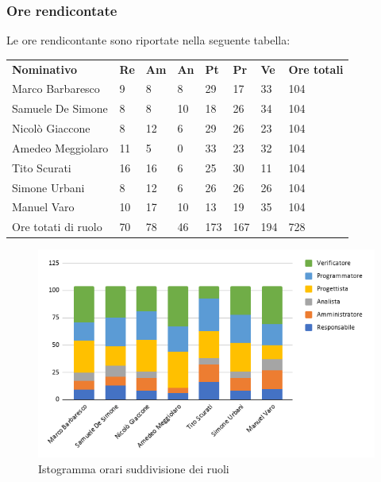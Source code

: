     \subsubsection{Ore rendicontate}
        Le ore rendicontante sono riportate nella seguente tabella:
            \begin{center}
                \begin{table}[ht!]
                    \centering
                    \renewcommand{\arraystretch}{1.8}
                    \begin{tabular}{p{100px} p{20px} p{20px} p{20px} p{20px} p{20px} p{20px} p{50px} }
                        \rowcolor{logo!70} \textbf{Nominativo} & \textbf{Re} & \textbf{Am} & \textbf{An} & \textbf{Pt} & \textbf{Pr} & \textbf{Ve} & \textbf{Ore totali}\\
                        Marco Barbaresco & 9 & 8 & 8 & 29 & 17 & 33 & 104\\
                        Samuele De Simone & 8 & 8 & 10 & 18 & 26 & 34 & 104\\
                        Nicolò Giaccone & 8 & 12 & 6 & 29 & 26 & 23 & 104\\
                        Amedeo Meggiolaro & 11 & 5 & 0 & 33 & 23 & 32 & 104\\
                        Tito Scurati & 16 & 16 & 6 & 25 & 30 & 11 & 104\\
                        Simone Urbani & 8 & 12 & 6 & 26 & 26 & 26 & 104\\
                        Manuel Varo & 10 & 17 & 10 & 13 & 19 & 35 & 104\\
                        Ore totati di ruolo & 70 & 78 & 46 & 173 & 167 & 194 & 728\\
                    \end{tabular}
                \end{table}
            \end{center}
            \pagebreak
        \begin{figure}[!h]
            \caption{Istogramma orari suddivisione dei ruoli}
            \vspace{5px}
            \includegraphics[scale=0.6]{../../../Images/Diagrammi/Istogrammi/ore rendicontate.png}
            \centering
        \end{figure}
